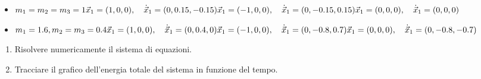 \begin{itemize}
	\item
	      \quad\parbox{\linewidth}{
		      \begin{math}
			      m_1 = m_2 = m_3 = 1 \\
			      \vec{x}_1 = (1, 0, 0), \quad \dot{\vec{x}}_1 = (0, 0.15, -0.15) \\
			      \vec{x}_1 = (-1, 0, 0), \quad \dot{\vec{x}}_1 = (0, -0.15, 0.15) \\
			      \vec{x}_1 = (0, 0, 0), \quad \dot{\vec{x}}_1 = (0, 0, 0)
		      \end{math}
		      \\
	      }
	\item
	      \quad\parbox{\linewidth}{
		      \begin{math}
			      m_1 = 1.6, m_2 = m_3 = 0.4 \\
			      \vec{x}_1 = (1, 0, 0), \quad \dot{\vec{x}}_1 = (0, 0.4, 0) \\
			      \vec{x}_1 = (-1, 0, 0), \quad \dot{\vec{x}}_1 = (0, -0.8, 0.7) \\
			      \vec{x}_1 = (0, 0, 0), \quad \dot{\vec{x}}_1 = (0, -0.8, -0.7)
		      \end{math}
	      }
\end{itemize}

\begin{enumerate}
	\item Risolvere numericamente il sistema di equazioni.
	\item Tracciare il grafico dell'energia totale del sistema in funzione del tempo.
\end{enumerate}
